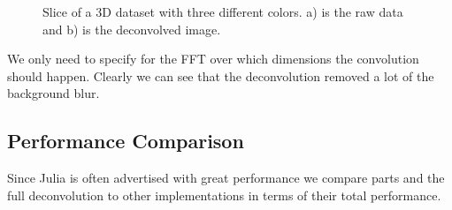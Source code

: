\documentclass{juliacon}
\begin{document}
\begin{figure}[h]
\begin{subfigure}{.25\textwidth}
            \end{subfigure}
            \caption{Slice of a 3D dataset with three different colors. a) is the raw data and b) is the
                    deconvolved image.}
            \label{fig:result_3d}
        \end{figure} 
        We only need to specify for the FFT over which dimensions the convolution should happen.
        Clearly we can see that the deconvolution removed a lot of the background blur.

    \subsection{Performance Comparison}
        Since Julia is often advertised with great performance we compare parts and the full deconvolution to other implementations in
        terms of their total performance.
\end{document}
